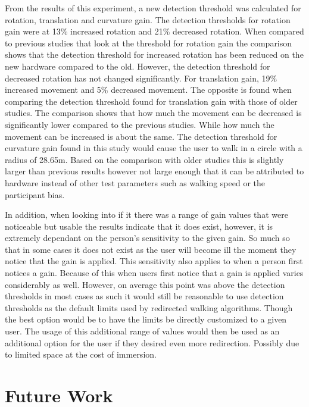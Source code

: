 
From the results of this experiment, a new detection threshold was calculated for rotation, translation and curvature gain. The detection thresholds for rotation gain were at 13\% increased rotation and 21\% decreased rotation. When compared to previous studies that look at the threshold for rotation gain the comparison shows that the detection threshold for increased rotation has been reduced on the new hardware compared to the old. However, the detection threshold for decreased rotation has not changed significantly. For translation gain, 19\% increased movement and 5\% decreased movement. The opposite is found when comparing the detection threshold found for translation gain with those of older studies. The comparison shows that how much the movement can be decreased is significantly lower compared to the previous studies. While how much the movement can be increased is about the same. The detection threshold for curvature gain found in this study would cause the user to walk in a circle with a radius of 28.65m. Based on the comparison with older studies this is slightly larger than previous results however not large enough that it can be attributed to hardware instead of other test parameters such as walking speed or the participant bias.

In addition, when looking into if it there was a range of gain values that were noticeable but usable the results indicate that it does exist, however, it is extremely dependant on the person's sensitivity to the given gain. So much so that in some cases it does not exist as the user will become ill the moment they notice that the gain is applied. This sensitivity also applies to when a person first notices a gain. Because of this when users first notice that a gain is applied varies considerably as well. However, on average this point was above the detection thresholds in most cases as such it would still be reasonable to use detection thresholds as the default limits used by redirected walking algorithms. Though the best option would be to have the limits be directly customized to a given user. The usage of this additional range of values would then be used as an additional option for the user if they desired even more redirection. Possibly due to limited space at the cost of immersion.

\section{Future Work}
\label{sec:future}

